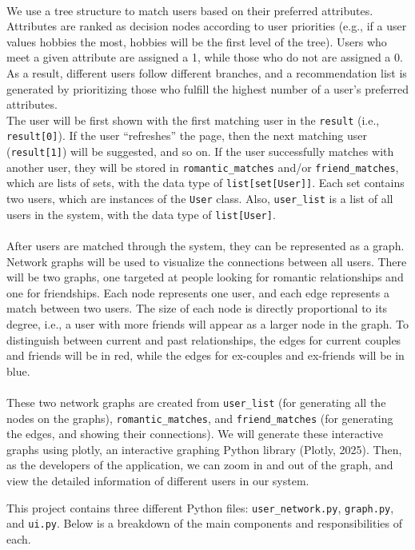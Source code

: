 \documentclass[fontsize=11pt]{article}
\begin{document}
\\
We use a tree structure to match users based on their preferred attributes. Attributes are ranked as decision nodes according to user priorities (e.g., if a user values hobbies the most, hobbies will be the first level of the tree). Users who meet a given attribute are assigned a 1, while those who do not are assigned a 0. As a result, different users follow different branches, and a recommendation list is generated by prioritizing those who fulfill the highest number of a user's preferred attributes.
\\
The user will be first shown with the first matching user in the \texttt{result}  (i.e., \texttt{result[0]}).
If the user “refreshes” the page, then the next matching user (\texttt{result[1]}) will be suggested, and so on.
If the user successfully matches with another user, they will be stored in \texttt{romantic\_matches} and/or \texttt{friend\_matches},
which are lists of sets, with the data type of \texttt{list[set[User]]}.
Each set contains two users, which are instances of the \texttt{User} class.
Also, \texttt{user\_list} is a list of all users in the system, with the data type of \texttt{list[User]}.
\\
\\
After users are matched through the system, they can be represented as a graph.
Network graphs will be used to visualize the connections between all users.
There will be two graphs, one targeted at people looking for romantic relationships and one for friendships.
Each node represents one user, and each edge represents a match between two users.
The size of each node is directly proportional to its degree, i.e., a user with more friends will appear as a larger node in the graph.
To distinguish between current and past relationships, the edges for current couples and friends will be in red, while the edges for ex-couples and ex-friends will be in blue.
\\
\\
These two network graphs are created from \texttt{user\_list} (for generating all the nodes on the graphs),
\texttt{romantic\_matches}, and \texttt{friend\_matches} (for generating the edges, and showing their connections).
We will generate these interactive graphs using plotly, an interactive graphing Python library (Plotly, 2025).
Then, as the developers of the application, we can zoom in and out of the graph, and view the detailed information of different users in our system.


This project contains three different Python files: \texttt{user\_network.py}, \texttt{graph.py}, and \texttt{ui.py}. Below is a breakdown of the main components and responsibilities of each.
\end{document}
